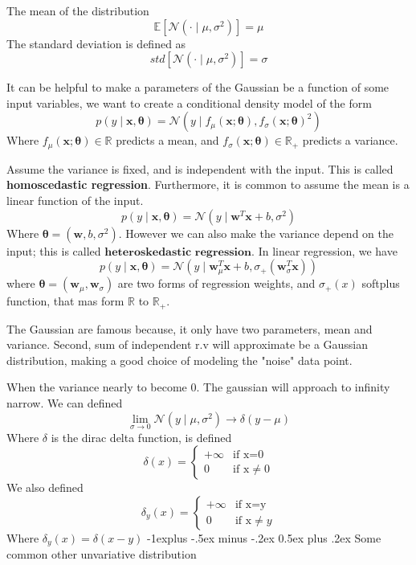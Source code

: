 \documentclass[10pt,landscape]{article}
\makeatletter
\newcommand{\N}{\mathcal{N}}
\newcommand{\mean}{\mathbb{E}}
\newcommand{\inp}{\textbf{x}}
\newcommand{\parameter}{\boldsymbol{\theta}}
\newcommand{\R}{\mathbb{R}}
\newcommand{\variance}{\sigma^2}
\newcommand{\normal}{\mathcal{N}}
\newcommand{\weight}{\mathbf{w}}
\newcommand{\softplus}[1]{\sigma_+(#1)}
\renewcommand{\subsection}{\@startsection{subsection}{2}{0mm}%
                                {-1explus -.5ex minus -.2ex}%
                                {0.5ex plus .2ex}%
                                {\normalfont\normalsize\bfseries}}
\makeatother
\begin{document}
\begin{multicols*}{3}
The mean of the distribution
\[\mean[\normal(\cdot\mid\mu,\variance)]=\mu\]
The standard deviation is defined as
\[std[\normal(\cdot\mid\mu,\variance)]=\sigma\]

It can be helpful to make a parameters of the Gaussian be a function of some input variables, we want to create a conditional density model of the form
\[
    p(y\mid\inp,\parameter)=\normal(y\mid f_{\mu}(\inp;\parameter),f_{\sigma}(\inp;\parameter)^2)
\]
Where $f_{\mu}(\inp;\parameter)\in\R$ predicts a mean, and $f_{\sigma}(\inp;\parameter)\in\R_+$ predicts a variance.

Assume the variance is fixed, and is independent with the input. This is called \textbf{homoscedastic regression}. Furthermore, it is common to assume the mean is a linear function of the input.
\[
    p(y\mid\inp,\parameter)=\normal(y\mid \weight^T\inp+b,\variance)
\]
Where $\parameter=(\weight,b,\variance)$. However we can also make the variance depend on the input; this is called $\textbf{heteroskedastic regression}$. In linear regression, we have
\[
    p(y\mid\inp,\parameter)=\normal(y\mid \weight_{\mu}^T\inp+b,\sigma_+(\weight_\sigma^T\inp))
\]
where $\parameter=(\weight_{\mu},\weight_\sigma)$ are two forms of regression weights, and $\softplus{x}$ softplus function, that mas form $\R$ to $\R_+$.

The Gaussian are famous because, it only have two parameters, mean and variance. Second, sum of independent r.v will approximate be a Gaussian distribution, making a good choice of modeling the "noise" data point.

When the variance nearly to become 0. The gaussian will  approach to infinity narrow. We can defined
\[
\lim_{\sigma\rightarrow0}\N(y\mid\mu,\variance)\rightarrow\delta(y-\mu)
\]
Where $\delta$ is the dirac delta function, is defined
\[
    \delta(x) = 
    \begin{cases}
        +\infty & \text{if x=0} \\
        0  & \text{if x}  \neq 0
    \end{cases}
\]
We also defined
\[
    \delta_y(x) = 
    \begin{cases}
        +\infty & \text{if x=y} \\
        0  & \text{if x}  \neq y
    \end{cases}
\]
Where $\delta_y(x) = \delta(x-y)$
\subsection{Some common other unvariative distribution}


\end{multicols*}
\end{document}
